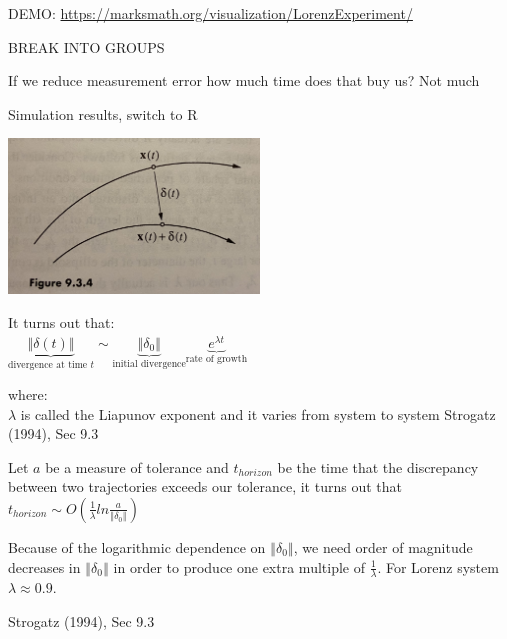 \documentclass[aspectratio=169]{beamer}
\begin{document}
\begin{frame}

DEMO: \url{https://marksmath.org/visualization/LorenzExperiment/}

\end{frame}
\begin{frame}

\Large{
BREAK INTO GROUPS
}

\end{frame}
\begin{frame}

If we reduce measurement error how much time does that buy us? \pause
Not much

\end{frame}
\begin{frame}

Simulation results, switch to R

\end{frame}
\begin{frame}

\begin{center}
\includegraphics[width = 0.5\textwidth]{figures/strogatz_nonlinear_1994_fig9_3_4}
\end{center}

\pause

It turns out that:\\
$ \underbrace{\left\Vert  \delta(t) \right\Vert}_{\text{divergence at time $t$}} \sim  \underbrace{\left\Vert \delta_0 \right\Vert}_{\text{initial divergence}}\underbrace{e^{\lambda t}}_{\text{rate of growth}}$

where:\\
$\lambda$ is called the Liapunov exponent and it varies from system to system
\vfill
Strogatz (1994), Sec 9.3
\end{frame}
\begin{frame}

Let $a$ be a measure of tolerance and $t_{horizon}$ be the time that the discrepancy between two trajectories exceeds our tolerance, it turns out that\\

$t_{horizon} \sim O \left( \frac{1}{\lambda} ln \frac{a}{\left\Vert \delta_0 \right\Vert} \right)$
 
Because of the logarithmic dependence on $\left\Vert \delta_0 \right\Vert$, we need order of magnitude decreases in $\left\Vert \delta_0 \right\Vert$ in order to produce one extra multiple of $\frac{1}{\lambda}$.  For Lorenz system $\lambda \approx 0.9$.  
 
\vfill
Strogatz (1994), Sec 9.3
\end{frame}
\end{document}
